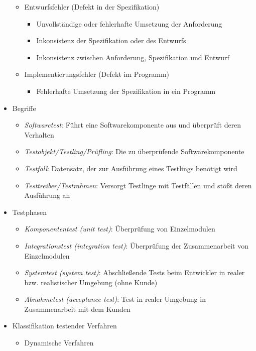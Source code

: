 \documentclass{article}
\begin{document}
\begin{itemize}
\begin{itemize}
    \item Entwurfsfehler (Defekt in der Spezifikation)
    \begin{itemize}
      \item Unvollständige oder fehlerhafte Umsetzung der Anforderung
      \item Inkonsistenz der Spezifikation oder des Entwurfs
      \item Inkonsistenz zwischen Anforderung, Spezifikation und Entwurf
    \end{itemize}
    \item Implementierungsfehler (Defekt im Programm)
    \begin{itemize}
      \item Fehlerhafte Umsetzung der Spezifikation in ein Programm
    \end{itemize}
  \end{itemize}
  \item Begriffe
  \begin{itemize}
    \item \textit{Softwaretest}: Führt eine Softwarekomponente aus und überprüft deren Verhalten
    \item \textit{Testobjekt/Testling/Prüfling}: Die zu überprüfende Softwarekomponente
    \item \textit{Testfall}: Datensatz, der zur Ausführung eines Testlings benötigt wird
    \item \textit{Testtreiber/Testrahmen}: Versorgt Testlinge mit Testfällen und stößt deren Ausführung an
  \end{itemize}
  \item Testphasen
  \begin{itemize}
    \item \textit{Komponententest (unit test)}: Überprüfung von Einzelmodulen
    \item \textit{Integrationstest (integration test)}: Überprüfung der Zusammenarbeit von Einzelmodulen 
    \item \textit{Systemtest (system test)}: Abschließende Tests beim Entwickler in realer bzw. realistischer Umgebung (ohne Kunde)
    \item \textit{Abnahmetest (acceptance test)}: Test in realer Umgebung in Zusammenarbeit mit dem Kunden
  \end{itemize}
  \item Klassifikation testender Verfahren
  \begin{itemize}
    \item Dynamische Verfahren
    \begin{itemize}

\end{itemize}
\end{itemize}
\end{itemize}
\end{document}
